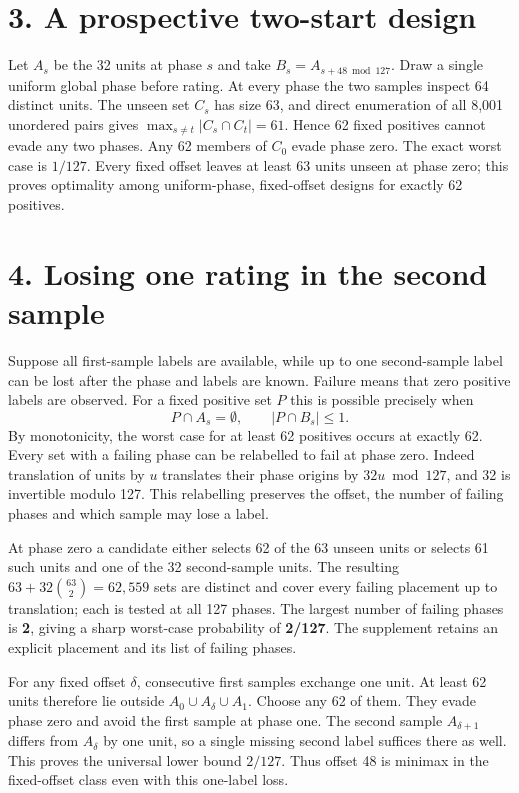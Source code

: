 \documentclass[11pt]{article}
\begin{document}
\section*{3. A prospective two-start design}
Let $A_s$ be the 32 units at phase $s$ and take $B_s=A_{s+48\bmod127}$. Draw a single uniform global phase before rating. At every phase the two samples inspect 64 distinct units. The unseen set $C_s$ has size 63, and direct enumeration of all 8,001 unordered pairs gives $\max_{s\ne t}|C_s\cap C_t|=61$. Hence 62 fixed positives cannot evade any two phases. Any 62 members of $C_0$ evade phase zero. The exact worst case is $1/127$. Every fixed offset leaves at least 63 units unseen at phase zero; this proves optimality among uniform-phase, fixed-offset designs for exactly 62 positives.
\newpage
\section*{4. Losing one rating in the second sample}
Suppose all first-sample labels are available, while up to one second-sample label can be lost after the phase and labels are known. Failure means that zero positive labels are observed. For a fixed positive set $P$ this is possible precisely when
\[
 P\cap A_s=\emptyset,\qquad |P\cap B_s|\le1.
\]
By monotonicity, the worst case for at least 62 positives occurs at exactly 62. Every set with a failing phase can be relabelled to fail at phase zero. Indeed translation of units by $u$ translates their phase origins by $32u\bmod127$, and 32 is invertible modulo 127. This relabelling preserves the offset, the number of failing phases and which sample may lose a label.

At phase zero a candidate either selects 62 of the 63 unseen units or selects 61 such units and one of the 32 second-sample units. The resulting $63+32\binom{63}{2}=62{,}559$ sets are distinct and cover every failing placement up to translation; each is tested at all 127 phases. The largest number of failing phases is \textbf{2}, giving a sharp worst-case probability of \textbf{2/127}. The supplement retains an explicit placement and its list of failing phases.

For any fixed offset $\delta$, consecutive first samples exchange one unit. At least 62 units therefore lie outside $A_0\cup A_\delta\cup A_1$. Choose any 62 of them. They evade phase zero and avoid the first sample at phase one. The second sample $A_{\delta+1}$ differs from $A_\delta$ by one unit, so a single missing second label suffices there as well. This proves the universal lower bound $2/127$. Thus offset 48 is minimax in the fixed-offset class even with this one-label loss.
\end{document}
